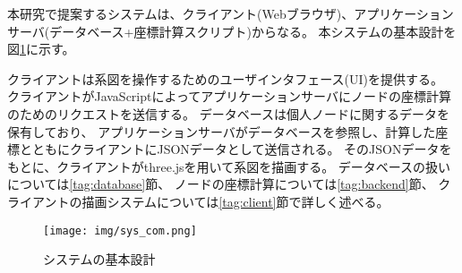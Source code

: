 \label{tag:app}
本研究で提案するシステムは、クライアント(Webブラウザ)、アプリケーションサーバ(データベース+座標計算スクリプト)からなる。
本システムの基本設計を図\ref{fig:sys_com}に示す。

クライアントは系図を操作するためのユーザインタフェース(UI)を提供する。
クライアントがJavaScriptによってアプリケーションサーバにノードの座標計算のためのリクエストを送信する。
データベースは個人ノードに関するデータを保有しており、
アプリケーションサーバがデータベースを参照し、計算した座標とともにクライアントにJSONデータとして送信される。
そのJSONデータをもとに、クライアントがthree.jsを用いて系図を描画する。
データベースの扱いについては\ref{tag:database}節、
ノードの座標計算については\ref{tag:backend}節、
クライアントの描画システムについては\ref{tag:client}節で詳しく述べる。

\begin{figure}[htbp]
    \begin{center}
        \texttt{[image: img/sys\_com.png]}
        \caption{システムの基本設計}
        \label{fig:sys_com}
    \end{center}
\end{figure}